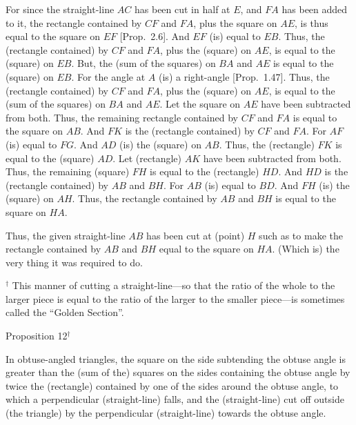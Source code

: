 For since the straight-line $AC$ has been cut in half at $E$, and $FA$ has been
added to it, the rectangle contained by $CF$ and $FA$, plus the square on $AE$, is
thus equal to the square on $EF$ [Prop.~2.6]. And $EF$ (is) equal to $EB$. Thus,
the (rectangle contained) by $CF$ and $FA$, plus the (square) on $AE$, is equal
to the (square) on $EB$. But, the (sum of the squares) on $BA$ and $AE$ is equal
to the (square) on $EB$. For the angle at $A$ (is) a right-angle [Prop.~1.47].
Thus, the (rectangle contained) by $CF$ and $FA$, plus the (square) on $AE$,
is equal to the (sum of the squares) on $BA$ and $AE$. Let the square on $AE$ have
been subtracted from both. Thus, the remaining rectangle contained by
$CF$ and $FA$ is equal to the square on $AB$.  And $FK$ is the (rectangle contained)
by $CF$ and $FA$. For $AF$ (is) equal to $FG$. And $AD$ (is) the (square) on $AB$. Thus, the
(rectangle) $FK$ is equal to the (square) $AD$. Let (rectangle) $AK$ have been
subtracted from both. Thus, the remaining (square) $FH$ is equal to 
the (rectangle) $HD$. And  $HD$ is the (rectangle contained) by $AB$ and $BH$.
For $AB$ (is) equal to $BD$. And $FH$ (is) the (square) on $AH$.
Thus, the rectangle contained by $AB$ and $BH$ is equal to the square on $HA$.

Thus, the given straight-line $AB$ has been cut at (point) $H$ such as to make
the rectangle contained by $AB$ and $BH$ equal to the square on $HA$.
(Which is) the very thing it was required to do.

{\footnotesize \noindent$^\dag$ This manner of cutting a straight-line---so
that the ratio of the whole to the larger piece is equal to the ratio
of the larger to the smaller piece---is sometimes called the ``Golden Section''.}


\begin{center}
{\large Proposition 12$^\dag$}
\end{center}

In obtuse-angled triangles, the square on the side subtending the obtuse
angle is greater than the (sum of the) squares on the sides containing the obtuse angle
by twice the (rectangle) contained by one of the sides around the obtuse
angle, to which a perpendicular (straight-line) falls, and the 
 (straight-line) cut off outside (the triangle)
 by the perpendicular (straight-line) towards the obtuse angle.
 
 \epsfysize=1.8in
\centerline{}
 
